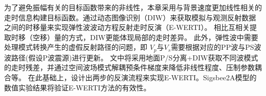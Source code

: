 为了避免振幅有关的目标函数带来的非线性，本章采用与背景速度更加线性相关的
走时信息构建目标函数。通过动态图像识别（DIW）来获取模拟与观测反射数据之间的时移量\cite{ma2013}来实现弹性波波动方程反射走时反演（E-WERTI）。
相比互相关提取时移（空移）量的方式\cite{chi2015,Wang2015}，DIW更能体现局部的走时差异。
此外，弹性波中需要处理模式转换产生的虚假反射路径的问题，即
$V_p$与$V_s$需要根据对应的PP波与PS波波路径(假设P波震源)进行更新。
文中将采用地面P/S分离+DIW获取不同波模式的走时残差，并通过空间波场模式解耦预条件梯度来降低非线性程度、压制参数耦合等。
在此基础上，设计出两步的反演流程来实现E-WERTI。Sigsbee2A模型的数值实验结果将验证E-WERTI方法的有效性。
